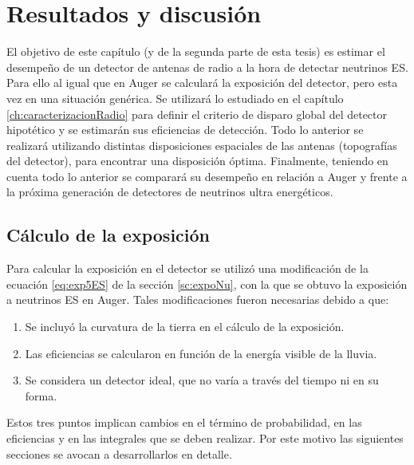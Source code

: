 \chapter{Resultados y discusi\'on}
\label{ch:resultadosRadio}

El objetivo de este cap\'itulo (y de la segunda parte de esta tesis) es estimar el desempe\~no  de un detector de antenas de radio a la hora de detectar neutrinos ES.
Para ello al igual que en Auger se calcular\'a la exposici\'on del detector, pero esta vez en una situaci\'on gen\'erica.
Se utilizar\'a lo estudiado en el cap\'itulo \ref{ch:caracterizacionRadio} para definir el criterio de disparo global del detector hipot\'etico y se estimar\'an sus eficiencias de detecci\'on.
Todo lo anterior se realizar\'a utilizando distintas disposiciones espaciales de las antenas (topograf\'ias del detector), para encontrar una disposici\'on \'optima.
Finalmente, teniendo en cuenta todo lo anterior se comparar\'a su desempe\~no en relaci\'on a Auger y frente a la pr\'oxima generaci\'on de detectores de neutrinos ultra energ\'eticos.

\section{C\'alculo de la exposici\'on}
	
	Para calcular la exposici\'on en el detector se utiliz\'o una modificaci\'on de la ecuaci\'on \ref{eq:exp5ES} de la secci\'on \ref{sc:expoNu}, con la que se obtuvo la exposici\'on a neutrinos ES en Auger.
	Tales modificaciones fueron necesarias debido a que:
	\begin{enumerate}
	 \item Se incluy\'o la curvatura de la tierra en el c\'alculo de la exposici\'on.
	 \item Las eficiencias se calcularon en funci\'on de la energ\'ia visible de la lluvia.
	 \item Se considera un detector ideal, que no var\'ia a trav\'es del tiempo ni en su forma.
	\end{enumerate}
	Estos tres puntos implican cambios en el t\'ermino de probabilidad, en las eficiencias y en las integrales que se deben realizar.
	Por este motivo las siguientes secciones se avocan a desarrollarlos en detalle.
	

